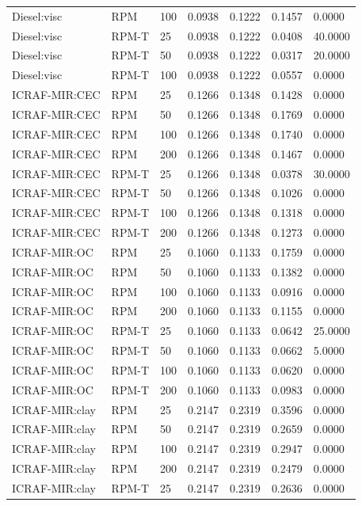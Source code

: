 \begin{tabular}{lllllll}
Diesel:visc & RPM & 100 & 0.0938 & 0.1222 & 0.1457 & 0.0000 \\
Diesel:visc & RPM-T & 25 & 0.0938 & 0.1222 & 0.0408 & 40.0000 \\
Diesel:visc & RPM-T & 50 & 0.0938 & 0.1222 & 0.0317 & 20.0000 \\
Diesel:visc & RPM-T & 100 & 0.0938 & 0.1222 & 0.0557 & 0.0000 \\
ICRAF-MIR:CEC & RPM & 25 & 0.1266 & 0.1348 & 0.1428 & 0.0000 \\
ICRAF-MIR:CEC & RPM & 50 & 0.1266 & 0.1348 & 0.1769 & 0.0000 \\
ICRAF-MIR:CEC & RPM & 100 & 0.1266 & 0.1348 & 0.1740 & 0.0000 \\
ICRAF-MIR:CEC & RPM & 200 & 0.1266 & 0.1348 & 0.1467 & 0.0000 \\
ICRAF-MIR:CEC & RPM-T & 25 & 0.1266 & 0.1348 & 0.0378 & 30.0000 \\
ICRAF-MIR:CEC & RPM-T & 50 & 0.1266 & 0.1348 & 0.1026 & 0.0000 \\
ICRAF-MIR:CEC & RPM-T & 100 & 0.1266 & 0.1348 & 0.1318 & 0.0000 \\
ICRAF-MIR:CEC & RPM-T & 200 & 0.1266 & 0.1348 & 0.1273 & 0.0000 \\
ICRAF-MIR:OC & RPM & 25 & 0.1060 & 0.1133 & 0.1759 & 0.0000 \\
ICRAF-MIR:OC & RPM & 50 & 0.1060 & 0.1133 & 0.1382 & 0.0000 \\
ICRAF-MIR:OC & RPM & 100 & 0.1060 & 0.1133 & 0.0916 & 0.0000 \\
ICRAF-MIR:OC & RPM & 200 & 0.1060 & 0.1133 & 0.1155 & 0.0000 \\
ICRAF-MIR:OC & RPM-T & 25 & 0.1060 & 0.1133 & 0.0642 & 25.0000 \\
ICRAF-MIR:OC & RPM-T & 50 & 0.1060 & 0.1133 & 0.0662 & 5.0000 \\
ICRAF-MIR:OC & RPM-T & 100 & 0.1060 & 0.1133 & 0.0620 & 0.0000 \\
ICRAF-MIR:OC & RPM-T & 200 & 0.1060 & 0.1133 & 0.0983 & 0.0000 \\
ICRAF-MIR:clay & RPM & 25 & 0.2147 & 0.2319 & 0.3596 & 0.0000 \\
ICRAF-MIR:clay & RPM & 50 & 0.2147 & 0.2319 & 0.2659 & 0.0000 \\
ICRAF-MIR:clay & RPM & 100 & 0.2147 & 0.2319 & 0.2947 & 0.0000 \\
ICRAF-MIR:clay & RPM & 200 & 0.2147 & 0.2319 & 0.2479 & 0.0000 \\
ICRAF-MIR:clay & RPM-T & 25 & 0.2147 & 0.2319 & 0.2636 & 0.0000 \\

\end{tabular}
